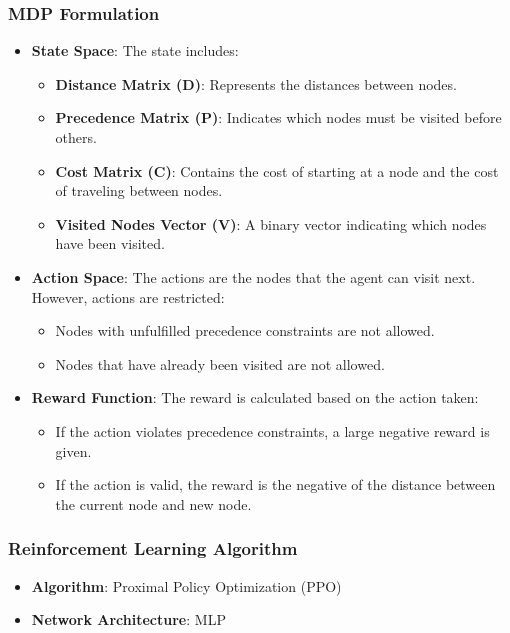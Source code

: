 \documentclass{beamer}
\begin{document}
\begin{frame}
    \frametitle{MDP Formulation}
    \begin{itemize}
        \item \textbf{State Space}: The state includes:
        \begin{itemize}
            \item \textbf{Distance Matrix (D)}: Represents the distances between nodes.
            \item \textbf{Precedence Matrix (P)}: Indicates which nodes must be visited before others.
            \item \textbf{Cost Matrix (C)}: Contains the cost of starting at a node and the cost of traveling between nodes.
            \item \textbf{Visited Nodes Vector (V)}: A binary vector indicating which nodes have been visited.
        \end{itemize}
        \item \textbf{Action Space}: The actions are the nodes that the agent can visit next. However, actions are restricted:
        \begin{itemize}
            \item Nodes with unfulfilled precedence constraints are not allowed.
            \item Nodes that have already been visited are not allowed.
        \end{itemize}
        \item \textbf{Reward Function}: The reward is calculated based on the action taken:
        \begin{itemize}
            \item If the action violates precedence constraints, a large negative reward is given.
            \item If the action is valid, the reward is the negative of the distance between the current node and new node.
        \end{itemize}
    \end{itemize}
\end{frame}

\begin{frame}
    \frametitle{Reinforcement Learning Algorithm}
    \begin{itemize}
        \item \textbf{Algorithm}: Proximal Policy Optimization (PPO)
        \item \textbf{Network Architecture}: MLP
    \end{itemize}
\end{frame}
\end{document}
